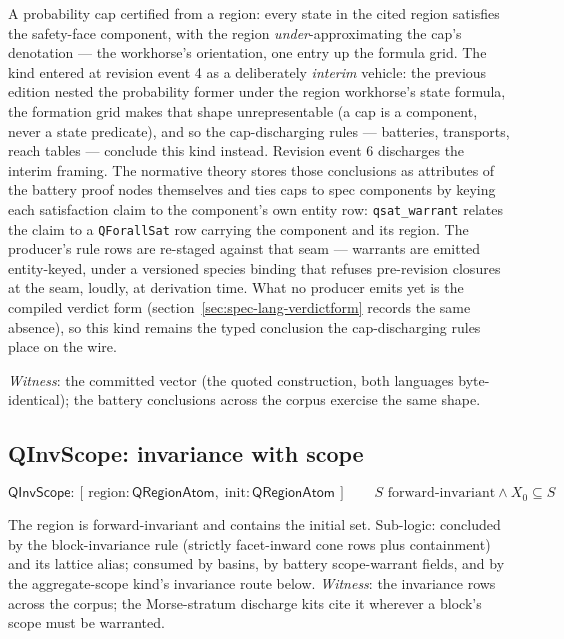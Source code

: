 A probability cap certified from a region: every state in the cited
region satisfies the safety-face component, with the region
\emph{under}-approximating the cap's denotation --- the workhorse's
orientation, one entry up the formula grid. The kind entered at
revision event 4 as a deliberately \emph{interim} vehicle: the
previous edition nested the probability former under the region
workhorse's state formula, the formation grid makes that shape
unrepresentable (a cap is a component, never a state predicate), and
so the cap-discharging rules --- batteries, transports, reach tables
--- conclude this kind instead. Revision event 6 discharges the
interim framing. The normative theory stores those conclusions as
attributes of the battery proof nodes themselves and ties caps to
spec components by keying each satisfaction claim to the component's
own entity row: \texttt{qsat\_warrant} relates the claim to a
\texttt{QForallSat} row carrying the component and its region. The
producer's rule rows are re-staged against that seam --- warrants
are emitted entity-keyed, under a versioned species binding that
refuses pre-revision closures at the seam, loudly, at derivation
time. What no producer emits yet is the compiled verdict form
(section~\ref{sec:spec-lang-verdictform} records the same absence),
so this kind remains the typed conclusion the cap-discharging rules
place on the wire.

\emph{Witness}: the committed vector (the quoted construction, both
languages byte-identical); the battery conclusions across the corpus
exercise the same shape.



\subsection{QInvScope: invariance with scope}
\label{sec:spec-lang-qinvscope}

\[
\mathsf{QInvScope} : [\, \mathrm{region} : \mathsf{QRegionAtom},\;
  \mathrm{init} : \mathsf{QRegionAtom} \,]
\qquad
S \text{ forward-invariant} \wedge X_0 \subseteq S
\]

The region is forward-invariant and contains the initial set.
Sub-logic: concluded by the block-invariance rule (strictly
facet-inward cone rows plus containment) and its lattice alias;
consumed by basins, by battery scope-warrant fields, and by the
aggregate-scope kind's invariance route below.
\emph{Witness}: the invariance rows across the corpus; the
Morse-stratum discharge kits cite it wherever a block's scope must be
warranted.

